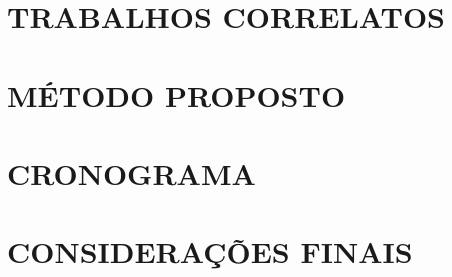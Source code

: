 \documentclass[
    12pt,       %
    oneside,    %
    a4paper,    %
%
    chapter=TITLE,	  	  %
%
    english,			  %
    brazil				  %
%
]{abntex2}
\begin{document}
\chapter{TRABALHOS CORRELATOS}
\label{chapter:correlatos}
%


\chapter{MÉTODO PROPOSTO}
\label{chapter:metodo}


\chapter{CRONOGRAMA}
\label{chapter:cronograma}
%

\chapter{CONSIDERAÇÕES FINAIS}
\label{chapter:consideracoes}
%
%


\printindex
\end{document}
